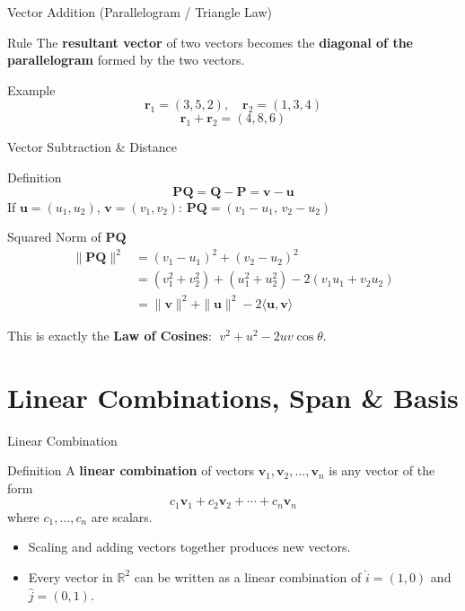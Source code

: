 \documentclass[9pt,aspectratio=169]{beamer}
\newcommand{\R}{\mathbb{R}}
\newcommand{\vect}[1]{\mathbf{#1}}
\begin{document}
\begin{frame}{Vector Addition (Parallelogram / Triangle Law)}
\begin{block}{Rule}
The \textbf{resultant vector} of two vectors becomes the \textbf{diagonal of the parallelogram} formed by the two vectors.
\end{block}
\begin{exampleblock}{Example}
$$\vect{r}_1=(3,5,2), \quad \vect{r}_2=(1,3,4)$$
$$\vect{r}_1+\vect{r}_2 = (4,8,6)$$
\end{exampleblock}
\centering
{}
\end{frame}

\begin{frame}{Vector Subtraction \& Distance}
\begin{block}{Definition}
$$\vect{PQ} = \vect{Q}-\vect{P} = \vect{v}-\vect{u}$$
If $\vect{u}=(u_1,u_2)$, $\vect{v}=(v_1,v_2)$: \quad $\vect{PQ} = (v_1-u_1,\, v_2-u_2)$
\end{block}
\begin{block}{Squared Norm of $\vect{PQ}$}
\begin{align*}
\|\vect{PQ}\|^2 &= (v_1-u_1)^2+(v_2-u_2)^2\\
&= (v_1^2+v_2^2)+(u_1^2+u_2^2) - 2(v_1u_1+v_2u_2)\\
&= \|\vect{v}\|^2+\|\vect{u}\|^2 - 2\langle \vect{u},\vect{v}\rangle
\end{align*}
\end{block}
This is exactly the \textbf{Law of Cosines}: $\;v^2+u^2-2uv\cos\theta$.
\end{frame}

\section{Linear Combinations, Span \& Basis}

\begin{frame}{Linear Combination}
\begin{block}{Definition}
A \textbf{linear combination} of vectors $\vect{v}_1, \vect{v}_2, \dots, \vect{v}_n$ is any vector of the form
$$c_1\vect{v}_1 + c_2\vect{v}_2 + \cdots + c_n\vect{v}_n$$
where $c_1, \dots, c_n$ are scalars.
\end{block}
\begin{itemize}
\item Scaling and adding vectors together produces new vectors.
\item Every vector in $\R^2$ can be written as a linear combination of $\hat{i}=(1,0)$ and $\hat{j}=(0,1)$.
\end{itemize}
\end{frame}
\end{document}
